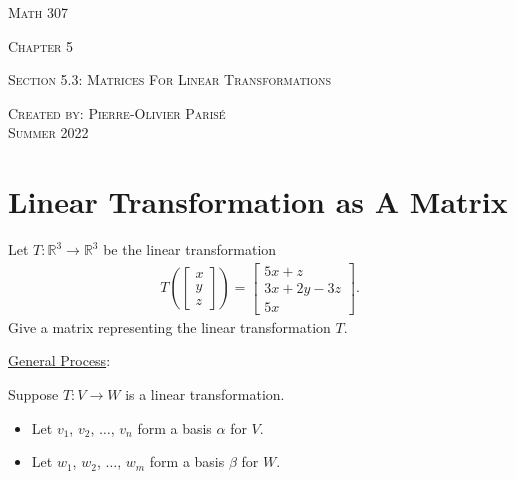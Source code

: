 \documentclass[12pt,a4paper]{article}
\newcounter{example}[section]
\begin{document}
\thispagestyle{empty}

\begin{center}
\vspace*{2.5cm}

{\Huge \textsc{Math 307}}

\vspace*{2cm}

{\LARGE \textsc{Chapter 5}} 

\vspace*{0.75cm}

\noindent\textsc{Section 5.3: Matrices For Linear Transformations}

\vspace*{0.75cm}

\tableofcontents

\vfill

\noindent \textsc{Created by: Pierre-Olivier Paris{\'e}} \\
\textsc{Summer 2022}
\end{center}

\newpage

\section{Linear Transformation as A Matrix}

	\begin{example}\label{Ex:BasisMatrixOperator}
	Let $T : \mathbb{R}^3 \rightarrow \mathbb{R}^3$ be the linear transformation
		\begin{align*}
		T \left( \begin{bmatrix}
		x \\ y \\ z
		\end{bmatrix} \right) = \begin{bmatrix}
		5x + z \\ 3x + 2y - 3z \\ 5x
		\end{bmatrix} .
		\end{align*}
	Give a matrix representing the linear transformation $T$.
	\end{example}
	
	\newpage
	
	\underline{General Process}:

	Suppose $T : V \rightarrow W$ is a linear transformation. 
	
	\begin{itemize}
	\item Let $v_1$, $v_2$, $\ldots$, $v_n$ form a basis $\alpha$ for $V$.
	\item Let $w_1$, $w_2$, $\ldots$, $w_m$ form a basis $\beta$ for $W$.
	\end{itemize}
	
\end{document}
